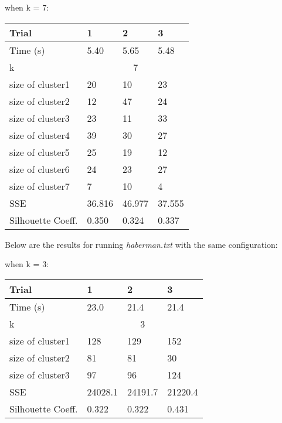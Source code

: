 \documentclass[12pt]{article}
\begin{document}
\newpage
when k = 7:
\begin{table}[h]
\centering
\begin{tabular}{|l|l|l|l|}
\hline
Trial             & 1      & 2      & 3     \\ \hline
Time (s)          & 5.40   & 5.65   & 5.48  \\ \hline
k                 & \multicolumn{3}{c|}{7}  \\ \hline
size of cluster1  & 20     & 10     & 23    \\ \hline
size of cluster2  & 12     & 47     & 24    \\ \hline
size of cluster3  & 23     & 11     & 33     \\ \hline
size of cluster4  & 39     & 30     & 27    \\ \hline
size of cluster5  & 25     & 19     & 12    \\ \hline
size of cluster6  & 24     & 23     & 27    \\ \hline
size of cluster7  & 7     & 10     & 4    \\ \hline
SSE               & 36.816 & 46.977 & 37.555 \\ \hline
Silhouette Coeff. & 0.350  & 0.324  & 0.337 \\ \hline
\end{tabular}
\end{table}


Below are the results for running \textit{haberman.txt} with the same configuration:



when k = 3:
\begin{table}[h]
\centering
\begin{tabular}{|l|l|l|l|}
\hline
Trial             & 1      & 2      & 3      \\ \hline
Time (s)          & 23.0   & 21.4   & 21.4  \\ \hline
k                 & \multicolumn{3}{c|}{3}    \\ \hline
size of cluster1  & 128    & 129    & 152     \\ \hline
size of cluster2  & 81     & 81     & 30     \\ \hline
size of cluster3  & 97     & 96     & 124     \\ \hline
SSE               & 24028.1 & 24191.7 & 21220.4 \\ \hline
Silhouette Coeff. & 0.322  & 0.322  & 0.431 \\ \hline
\end{tabular}
\end{table}
\end{document}
